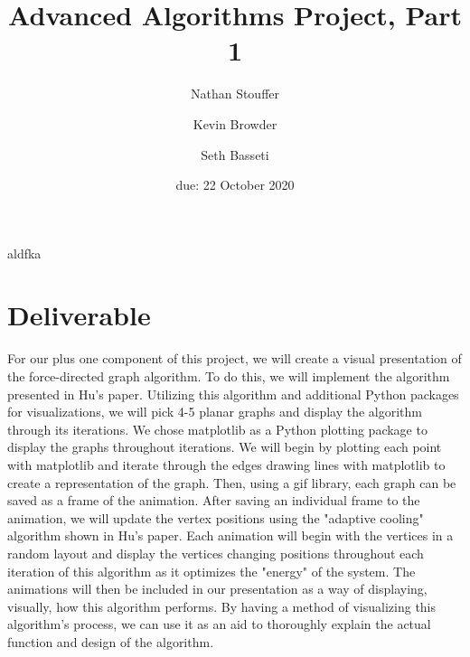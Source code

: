 \documentclass{article}
\title{Advanced Algorithms Project, Part 1}
\author{Nathan Stouffer \and Kevin Browder \and Seth Basseti}
\date{due: 22 October 2020}
\begin{document}
\maketitle

aldfka \cite{hu2005efficient}

\section{Deliverable}
For our plus one component of this project, we will create a visual presentation of the force-directed graph algorithm. To do this, we will implement the algorithm presented in Hu's paper. Utilizing this algorithm and additional Python packages for visualizations, we will pick 4-5 planar graphs and display the algorithm through its iterations. We chose matplotlib as a Python plotting package to display the graphs throughout iterations. We will begin by plotting each point with matplotlib and iterate through
the edges drawing lines with matplotlib to create a representation of the graph. Then, using a gif library, each graph can be saved as a frame of the animation. After
saving an individual frame to the animation, we will update the vertex positions using the "adaptive cooling" algorithm shown in Hu's paper. 
Each animation will begin with the vertices in a random layout and display the vertices changing positions throughout each iteration of this algorithm as it optimizes the "energy" of the system. The animations will then be included in our presentation as a way of displaying, visually, how this algorithm performs. By having a method of 
visualizing this algorithm's process, we can use it as an aid to thoroughly explain the actual function and design of the algorithm.

\newpage


\end{document}
